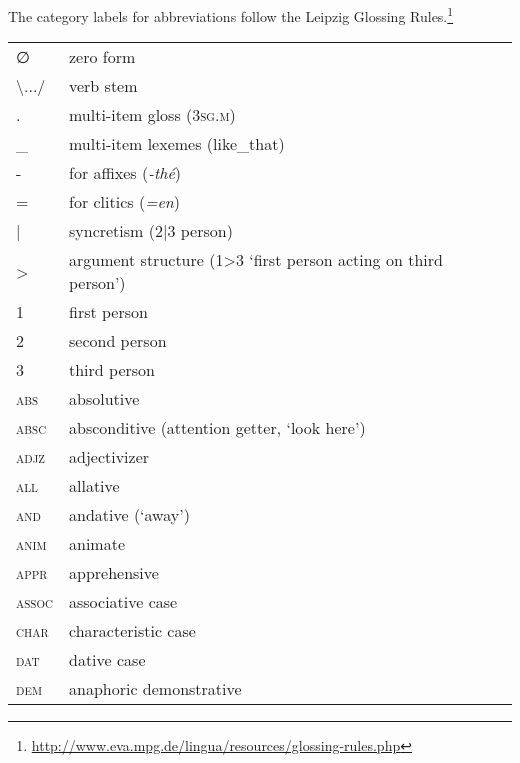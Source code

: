 \addchap{\lsAbbreviationsTitle}
The category labels for abbreviations follow the Leipzig Glossing Rules.\footnote{\url{http://www.eva.mpg.de/lingua/resources/glossing-rules.php}}
\vspace{.5cm}

\begin{tabularx}{.45\textwidth}{lQ}
    ∅ & zero form \\
    \textbackslash.../ & verb stem\\
    . & multi-item gloss (3\textsc{sg.m})\\
    \_ & multi-item lexemes (like\_that)\\
    - & for affixes (\textit{-thé})\\
    = & for clitics (\textit{=en})\\
    | & syncretism (2|3 person)\\
    > & argument structure (1>3 `first person acting on third person')\\
    1 & first person\\
    2 & second person\\
    3 & third person\\
    \textsc{abs} & absolutive\\    
    \textsc{absc} & absconditive (attention getter, `look here')\\
	\textsc{adjz} & adjectivizer\\
    \textsc{all} & allative\\
    \textsc{and} & andative (`away')\\
    \textsc{anim} & animate\\
    \textsc{appr} & apprehensive\\
    \textsc{assoc} & associative case\\
    \textsc{char} & characteristic case\\
    \textsc{dat} & dative case\\
    \textsc{dem} & anaphoric demonstrative\\
\end{tabularx}
